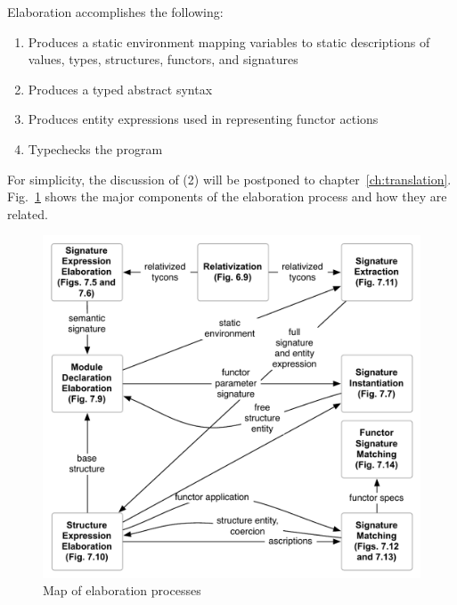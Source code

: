 Elaboration accomplishes the following:
\begin{enumerate}   
	\item Produces a static environment mapping variables to static descriptions of values, types, structures, functors, and signatures
	\item Produces a typed abstract syntax
	\item Produces entity expressions used in representing functor actions
	\item Typechecks the program
\end{enumerate}

For simplicity, the discussion of (2) will be postponed to chapter~\ref{ch:translation}. Fig.~\ref{fig:overview} shows the major components of the elaboration process and how they are related. 

\begin{figure}
\begin{center}
\includegraphics[scale=0.8]{figs/overview}
\end{center}
\caption{Map of elaboration processes}
\label{fig:overview}
\end{figure}
 


